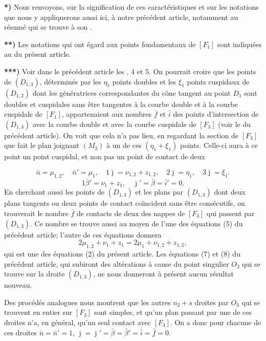 \documentclass{article}
\begin{document}
\textbf{*)} Nous renvoyons, sur la signification de ces caractéristiques et sur les notations que nous y appliquerons aussi ici, à notre précédent article, notamment au résumé qui se trouve à son .

\textbf{**)} Les notations qui ont égard aux points fondamentaux de $[F_1]$ sont indiquées au  du présent article.

\textbf{***)} Voir dans le précédent article les , 4 et 5. On pourrait croire que les points de $(D_{1, 3})$, déterminés par les $\eta_1$ points doubles et les $\xi_1$ points cuspidaux de $(D_{1, 2})$ dont les génératrices correspondantes du cône tangent au point $D_1$ sont doubles et cuspidales sans être tangentes à la courbe double et à la courbe cuspidale de $[F_1]$, appartenaient aux nombres $\bar{f}$ et $\bar{i}$ des points d'intersection de $(D_{1, 3})$ avec la courbe double et avec la courbe cuspidale de $[F_3]$ (voir le  du précédent article). On voit que cela n'a pas lieu, en regardant la section de $[F_3]$ que fait le plan joignant $(M_3)$ à un de ces $(\eta_1 + \xi_1)$ points. Celle-ci aura à ce point un point cuspidal, et non pas un point de contact de deux

\[
\bar{n} = \mu_{1, 2}, \quad \bar{n}' = \mu_1, \quad 1\bar{\jmath} = \nu_{1, 2} + z_{1, 2}, \quad 2\bar{\jmath} = \eta_1, \quad 3\bar{\jmath} = \xi_1.
\]
\[
1\bar{\beta}' = \nu_1 + z_1, \quad \bar{\jmath}' = \bar{\beta} = \bar{i}' = 0.
\]
En cherchant aussi les points de $(D_{1, 3})$ et les plans par $(D_{1, 3})$ dont deux plans tangents ou deux points de contact coïncident sans être consécutifs, on trouverait le nombre $\bar{f}$ de contacts de deux des nappes de $[F_3]$ qui passent par $(D_{1, 3})$. Ce nombre se trouve aussi au moyen de l'une des équations (5) du précédent article; l'autre de ces équations donnera
\[
2\mu_{1, 2} + \nu_1 + z_1 = 2\mu_1 + \nu_{1, 2} + z_{1, 2},
\]
qui est une des équations (2) du présent article. Les équations (7) et (8) du précédent article, qui subiront des altérations à cause du point singulier $O_3$ qui se trouve sur la droite $(D_{1, 3})$, ne nous donneront à présent aucun résultat nouveau.

Des procédés analogues nous montrent que les autres $n_2 + s$ droites par $O_3$ qui se trouvent en entier sur $[F_3]$ sont simples, et qu'un plan passant par une de ces droites n'a, en général, qu'un seul contact avec $[F_3]$. On a donc pour chacune de ces droites $\bar{n} = \bar{n}' = 1$, $\bar{\jmath} = \bar{\jmath}' = \bar{\beta} = \bar{\beta}' = \bar{i} = \bar{f} = 0$.
\end{document}
